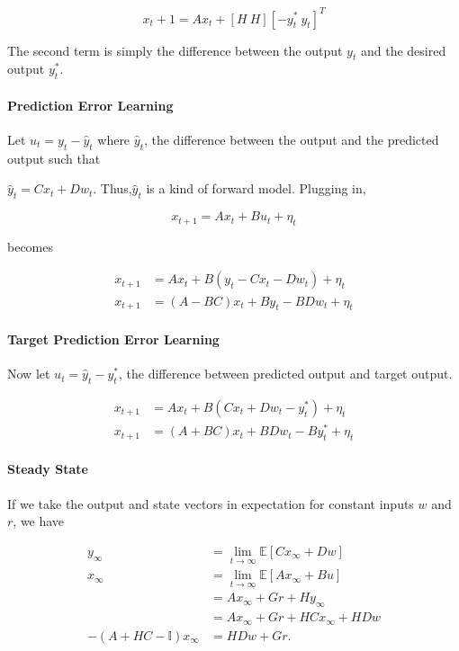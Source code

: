 \[x_t+1 = Ax_t + [H\ H][-y_t^*\ y_t]^T\]

The second term is simply the difference between the output \(y_t\) and
the desired output \(y_t^*\).

\paragraph{Prediction Error Learning}\label{prediction-error-learning}

Let \(u_t = y_t - \hat{y}_t\) where \(\hat{y}_t\), the difference
between the output and the predicted output such that

\(\hat{y}_t = Cx_t + Dw_t\). Thus,\(\hat{y}_t\) is a kind of forward
model. Plugging in,

\[x_{t+1} = Ax_t + Bu_t + \eta_t\]

becomes

\[
\begin{aligned}
x_{t+1} &= Ax_t + B(y_t - Cx_t - Dw_t) + \eta_t \\
x_{t+1} &= (A-BC)x_t + By_t - BDw_t + \eta_t
\end{aligned}
\]

\paragraph{Target Prediction Error
Learning}\label{target-prediction-error-learning}

Now let \(u_t = \hat{y}_t - y^*_t\), the difference between predicted
output and target output.

\[
\begin{aligned}
x_{t+1} &= Ax_t + B(Cx_t + Dw_t - y^*_t) + \eta_t \\
x_{t+1} &= (A+BC)x_t + BDw_t - By^*_t + \eta_t
\end{aligned}
\]

\paragraph{Steady State}\label{steady-state}

If we take the output and state vectors in expectation for constant
inputs \(w\) and \(r\), we have

\[
\begin{aligned}
y_\infty &= \lim_{t\to\infty}\mathbb{E}\left[Cx_\infty + Dw\right] \\
x_\infty &= \lim_{t\to\infty}\mathbb{E}\left[Ax_\infty + Bu\right] \\
&= Ax_\infty + Gr + Hy_\infty \\
&= Ax_\infty + Gr + HCx_\infty + HDw \\
-(A + HC - \mathbb{I})x_\infty &= HDw + Gr.
\end{aligned}
\]


